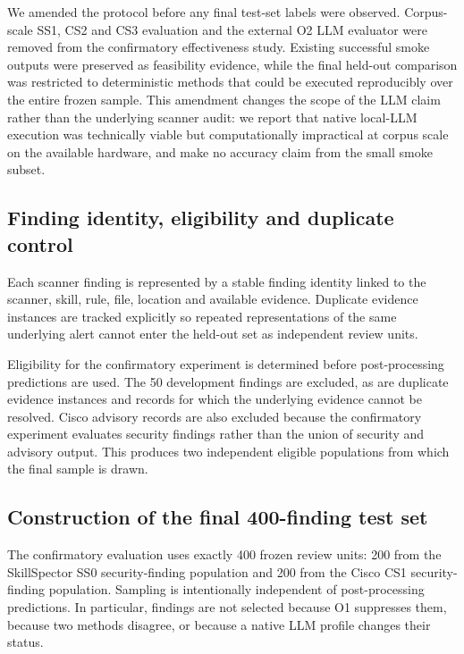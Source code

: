 \documentclass[conference]{IEEEtran}
\begin{document}
We amended the protocol before any final test-set labels were observed. Corpus-scale SS1, CS2 and CS3 evaluation and the external O2 LLM evaluator were removed from the confirmatory effectiveness study. Existing successful smoke outputs were preserved as feasibility evidence, while the final held-out comparison was restricted to deterministic methods that could be executed reproducibly over the entire frozen sample. This amendment changes the scope of the LLM claim rather than the underlying scanner audit: we report that native local-LLM execution was technically viable but computationally impractical at corpus scale on the available hardware, and make no accuracy claim from the small smoke subset.

\subsection{Finding identity, eligibility and duplicate control}

Each scanner finding is represented by a stable finding identity linked to the scanner, skill, rule, file, location and available evidence. Duplicate evidence instances are tracked explicitly so repeated representations of the same underlying alert cannot enter the held-out set as independent review units.

Eligibility for the confirmatory experiment is determined before post-processing predictions are used. The 50 development findings are excluded, as are duplicate evidence instances and records for which the underlying evidence cannot be resolved. Cisco advisory records are also excluded because the confirmatory experiment evaluates security findings rather than the union of security and advisory output. This produces two independent eligible populations from which the final sample is drawn.

\subsection{Construction of the final 400-finding test set}

The confirmatory evaluation uses exactly 400 frozen review units: 200 from the SkillSpector SS0 security-finding population and 200 from the Cisco CS1 security-finding population. Sampling is intentionally independent of post-processing predictions. In particular, findings are not selected because O1 suppresses them, because two methods disagree, or because a native LLM profile changes their status.
\end{document}

